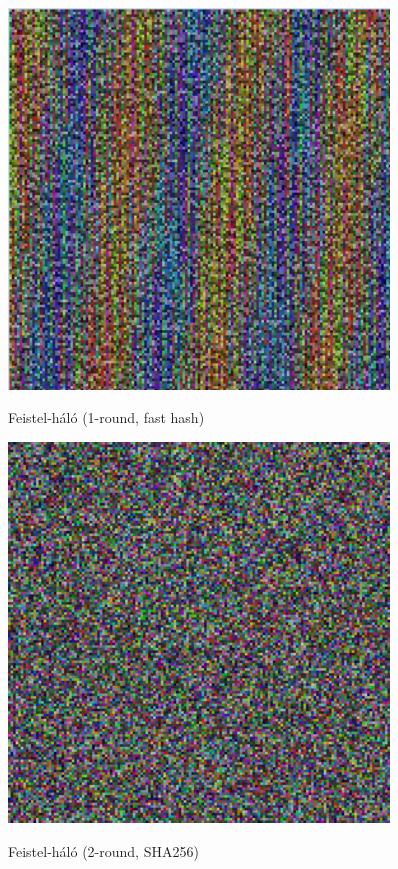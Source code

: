 \documentclass[
    parspace,
    noindent,
    nohyp,
]{elteiktdk}[2023/04/10]
\begin{document}
\begin{figure}[H]
  \vspace*{0.7cm}
  
  \hspace*{\fill}
  \begin{minipage}[b]{0.45\textwidth}
    \centering
    \includegraphics[width=0.9\textwidth]{image/permutation-feif1.png}
    \par Feistel-háló (1-round, fast hash)
  \end{minipage}
  \hspace*{\fill}
  \begin{minipage}[b]{0.45\textwidth}
    \centering
    \includegraphics[width=0.9\textwidth]{image/permutation-feis2.png}
    \par Feistel-háló (2-round, SHA256)
  \end{minipage}
  \hspace*{\fill}
  

\end{figure}
\end{document}
